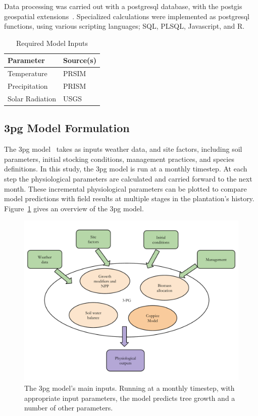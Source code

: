 \documentclass[preprint,12pt]{elsarticle}
\begin{document}
Data processing was carried out with a postgresql database, with the
postgis geospatial extensions~\cite{pgsql,Holl2009,postgis}.
Specialized calculations were implemented as postgresql functions, using
various scripting languages; SQL, PLSQL, Javascript, and R.

\begin{table}
  \centering
  \begin{tabular}[hp]{|l|l|}
    \hline
    Parameter & Source(s) \\
    \hline
    Temperature & \ac{PRSIM} \\
    Precipitation & \ac{PRISM} \\
    Solar Radiation & \ac{USGS} \\
    \hline
  \end{tabular}
  \caption{Required Model Inputs}
  \label{tab:input}
\end{table}
\subsection{\acs{3pg} Model Formulation}
\label{sec:3pg}

The \acf{3pg} model~\cite{Landsberg1997, landsberg2010physiological,
  Sands2004} takes as inputs weather data, and site factors, including
soil parameters, initial stocking conditions, management practices,
and species definitions.  In this study, the \ac{3pg} model is run at
a monthly timestep. At each step the physiological parameters are
calculated and carried forward to the next month.  These incremental
physiological parameters can be plotted to compare model predictions
with field results at multiple stages in the plantation’s history.
Figure~\ref{fig:overview} gives an overview of the \acf{3pg} model.

\begin{figure}[p]
\includegraphics[width=\linewidth]{model_overview}
\caption{ The \ac{3pg} model's main inputs.  Running at a monthly timestep, with
appropriate input parameters, the model predicts tree growth and a
number of other parameters.}
\label{fig:overview}
\end{figure}
\end{document}
